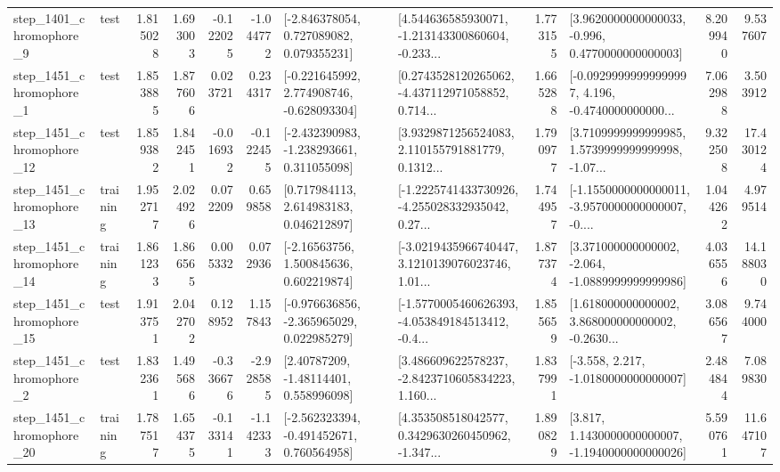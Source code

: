 \begin{tabular}{llrrrrllrlrr}
  step\_1401\_chromophore\_9 &      test &      1.815028 &    1.693003 &     -0.122025 & -1.044772 &    [-2.846378054, 0.727089082, 0.079355231] &  [4.544636585930071, -1.213143300860604, -0.233... &       1.773155 &   [3.9620000000000033, -0.996, 0.4770000000000003] &            8.209940 &          9.537607 \\
  step\_1451\_chromophore\_1 &      test &      1.853885 &    1.877606 &      0.023721 &  0.234317 &   [-0.221645992, 2.774908746, -0.628093304] &  [0.2743528120265062, -4.437112971058852, 0.714... &       1.665288 &  [-0.09299999999999997, 4.196, -0.4740000000000... &            7.062988 &          3.503912 \\
 step\_1451\_chromophore\_12 &      test &      1.859382 &    1.842451 &     -0.016932 & -0.122455 &   [-2.432390983, -1.238293661, 0.311055098] &  [3.9329871256524083, 2.110155791881779, 0.1312... &       1.790977 &  [3.7109999999999985, 1.5739999999999998, -1.07... &            9.322508 &         17.430124 \\
 step\_1451\_chromophore\_13 &  training &      1.952717 &    2.024926 &      0.072209 &  0.659858 &     [0.717984113, 2.614983183, 0.046212897] &  [-1.2225741433730926, -4.255028332935042, 0.27... &       1.744957 &  [-1.1550000000000011, -3.9570000000000007, -0.... &            1.044262 &          4.979514 \\
 step\_1451\_chromophore\_14 &  training &      1.861233 &    1.866565 &      0.005332 &  0.072936 &     [-2.16563756, 1.500845636, 0.602219874] &  [-3.0219435966740447, 3.1210139076023746, 1.01... &       1.877374 &   [3.371000000000002, -2.064, -1.0889999999999986] &            4.036556 &         14.188030 \\
 step\_1451\_chromophore\_15 &      test &      1.913751 &    2.042702 &      0.128952 &  1.157843 &   [-0.976636856, -2.365965029, 0.022985279] &  [-1.5770005460626393, -4.053849184513412, -0.4... &       1.855659 &  [1.618000000000002, 3.868000000000002, -0.2630... &            3.086567 &          9.744000 \\
  step\_1451\_chromophore\_2 &      test &      1.832361 &    1.495686 &     -0.336676 & -2.928585 &      [2.40787209, -1.48114401, 0.558996098] &  [3.486609622578237, -2.8423710605834223, 1.160... &       1.837991 &               [-3.558, 2.217, -1.0180000000000007] &            2.484844 &          7.089830 \\
 step\_1451\_chromophore\_20 &  training &      1.787517 &    1.654375 &     -0.133141 & -1.142333 &   [-2.562323394, -0.491452671, 0.760564958] &  [4.353508518042577, 0.3429630260450962, -1.347... &       1.890829 &   [3.817, 1.1430000000000007, -1.1940000000000026] &            5.590761 &         11.647107 \\

\end{tabular}
